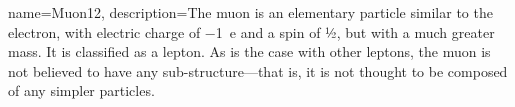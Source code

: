 {
    name=Muon12,
    description={The muon  is an elementary particle similar to the electron, with electric charge of −1 e and a spin of 1⁄2, but with a much greater mass. It is classified as a lepton. As is the case with other leptons, the muon is not believed to have any sub-structure—that is, it is not thought to be composed of any simpler particles.}
}

